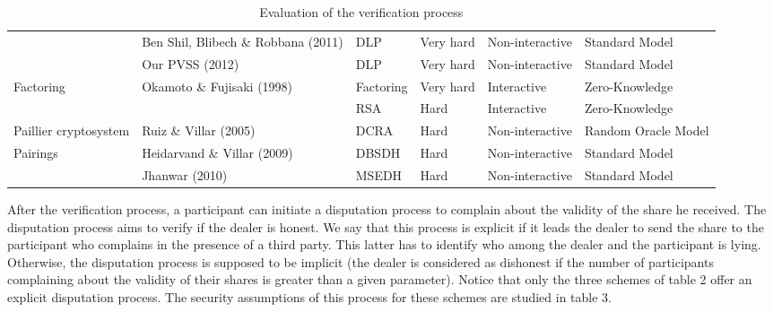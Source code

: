 \documentclass[submission,copyright,creativecommons]{eptcs}
\begin{document}
\begin{table*}[tbp]
\begin{tabular}{|p{2.5cm}||p{3cm}||p{1.5cm}||p{1.7cm}||p{1.6cm}||p{1.7cm}|}
\cline{2-6}
& Ben Shil, Blibech \& Robbana (2011) & DLP & Very hard & Non-interactive & 
Standard Model \\ \cline{2-6}
& Our PVSS (2012) & DLP & Very hard & Non-interactive & Standard Model \\ 
\hline
\multirow{2}{2.5cm}{Factoring} & \multirow{2}{3cm}{Okamoto \& Fujisaki (1998)} & Factoring & 
Very hard & Interactive & Zero-Knowledge \\ \cline{3-6}
&  & RSA & Hard & Interactive & Zero-Knowledge \\ \cline{1-4}\cline{2-6}
Paillier cryptosystem & Ruiz \& Villar (2005) & DCRA & Hard & 
Non-interactive & Random Oracle Model \\ \hline
\multirow{2}{2.5cm}{Pairings} & Heidarvand \& Villar (2009) & DBSDH & Hard & 
Non-interactive & Standard Model \\ \cline{2-6}
& Jhanwar (2010) & MSEDH & Hard & Non-interactive & Standard Model \\ \hline
\end{tabular}\caption{Evaluation of the verification process}\label{Evaluation of the
verification process}\end{table*}
After the verification process, a participant can initiate a disputation
process to complain about the validity of the share he received. The
disputation process aims to verify if the dealer is honest. We say that this
process is explicit if it leads the dealer to send the share to the
participant who complains in the presence of a third party. This latter has
to identify who among the dealer and the participant is lying. Otherwise,
the disputation process is supposed to be implicit (the dealer is considered
as dishonest if the number of participants complaining about the validity of
their shares is greater than a given parameter). Notice that only the three
schemes of table 2 offer an explicit disputation process. The security
assumptions of this process for these schemes are studied in table 3.
\end{document}
